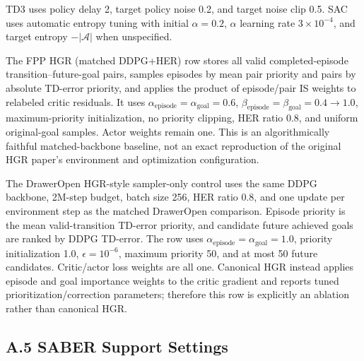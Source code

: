\documentclass[letterpaper]{article}
\begin{document}
TD3 uses policy delay 2, target policy noise 0.2, and target noise clip 0.5. SAC uses automatic entropy tuning with initial \(\alpha=0.2\), \(\alpha\) learning rate \(3\times10^{-4}\), and target entropy \(-|\mathcal A|\) when unspecified.

The FPP HGR (matched DDPG+HER) row stores all valid completed-episode transition--future-goal pairs, samples episodes by mean pair priority and pairs by absolute TD-error priority, and applies the product of episode/pair IS weights to relabeled critic residuals. It uses \(\alpha_{\mathrm{episode}}=\alpha_{\mathrm{goal}}=0.6\), \(\beta_{\mathrm{episode}}=\beta_{\mathrm{goal}}=0.4\rightarrow1.0\), maximum-priority initialization, no priority clipping, HER ratio 0.8, and uniform original-goal samples. Actor weights remain one. This is an algorithmically faithful matched-backbone baseline, not an exact reproduction of the original HGR paper's environment and optimization configuration.

The DrawerOpen HGR-style sampler-only control uses the same DDPG backbone, 2M-step budget, batch size 256, HER ratio 0.8, and one update per environment step as the matched DrawerOpen comparison. Episode priority is the mean valid-transition TD-error priority, and candidate future achieved goals are ranked by DDPG TD-error. The row uses \(\alpha_{\mathrm{episode}}=\alpha_{\mathrm{goal}}=1.0\), priority initialization 1.0, \(\epsilon=10^{-6}\), maximum priority 50, and at most 50 future candidates. Critic/actor loss weights are all one. Canonical HGR instead applies episode and goal importance weights to the critic gradient and reports tuned prioritization/correction parameters; therefore this row is explicitly an ablation rather than canonical HGR.

\subsection{A.5 SABER Support Settings}
\end{document}
